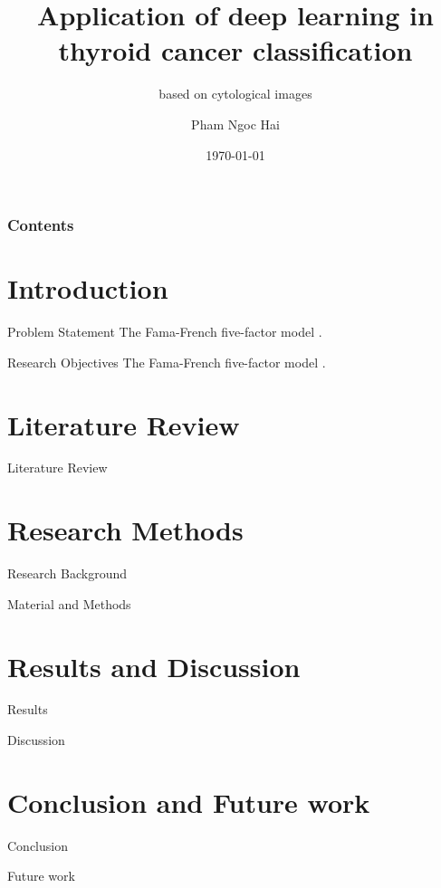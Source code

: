 \documentclass[10pt]{beamer}
\title[Hanoi University of Science, VNU]{Application of deep learning in thyroid cancer classification}
\subtitle{based on cytological images}
\author[Pham Ngoc Hai]{Pham Ngoc Hai}
\institute[harito.work@gmail.com]{Hanoi University of Science, VNU}
\date[\today]{\today}
\begin{document}
\frame{\titlepage}
\begin{frame}
\frametitle{Contents}
\tableofcontents
\end{frame}
\section{Introduction}
\begin{frame}{Problem Statement}
    The Fama-French five-factor model \citep{fama_five-factor_2015}.
\end{frame}
\begin{frame}{Research Objectives}
    The Fama-French five-factor model \citep{fama_five-factor_2015}.
\end{frame}

\section{Literature Review}
\begin{frame}{Literature Review}
    
\end{frame}

\section{Research Methods}
\begin{frame}{Research Background}
    
\end{frame}
\begin{frame}{Material and Methods}
    
\end{frame}

\section{Results and Discussion}
\begin{frame}{Results}
    
\end{frame}
\begin{frame}{Discussion}
    
\end{frame}

\section{Conclusion and Future work}
\begin{frame}{Conclusion}
    
\end{frame}
\begin{frame}{Future work}
    
\end{frame}
\end{document}
